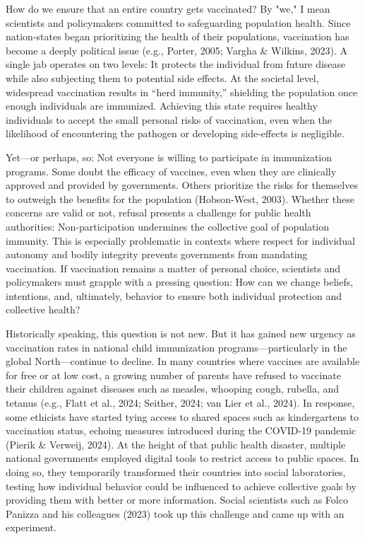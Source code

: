 \documentclass[authordate, empirical]{jote-new-article}
\begin{document}
	How do we ensure that an entire country gets vaccinated? By "we," I mean scientists and policymakers committed to safeguarding population health. Since nation-states began prioritizing the health of their populations, vaccination has become a deeply political issue (e.g., Porter, 2005; Vargha \& Wilkins, 2023). A single jab operates on two levels: It protects the individual from future disease while also subjecting them to potential side effects. At the societal level, widespread vaccination results in “herd immunity,” shielding the population once enough individuals are immunized. Achieving this state requires healthy individuals to accept the small personal risks of vaccination, even when the likelihood of encountering the pathogen or developing side-effects is negligible.







	Yet—or perhaps, so: Not everyone is willing to participate in immunization programs. Some doubt the efficacy of vaccines, even when they are clinically approved and provided by governments. Others prioritize the risks for themselves to outweigh the benefits for the population (Hobson-West, 2003). Whether these concerns are valid or not, refusal presents a challenge for public health authorities: Non-participation undermines the collective goal of population immunity. This is especially problematic in contexts where respect for individual autonomy and bodily integrity prevents governments from mandating vaccination. If vaccination remains a matter of personal choice, scientists and policymakers must grapple with a pressing question: How can we change beliefs, intentions, and, ultimately, behavior to ensure both individual protection and collective health?







	Historically speaking, this question is not new. But it has gained new urgency as vaccination rates in national child immunization programs—particularly in the global North—continue to decline. In many countries where vaccines are available for free or at low cost, a growing number of parents have refused to vaccinate their children against diseases such as measles, whooping cough, rubella, and tetanus (e.g., Flatt et al., 2024; Seither, 2024; van Lier et al., 2024). In response, some ethicists have started tying access to shared spaces such as kindergartens to vaccination status, echoing measures introduced during the COVID-19 pandemic (Pierik \& Verweij, 2024). At the height of that public health disaster, multiple national governments employed digital tools to restrict access to public spaces. In doing so, they temporarily transformed their countries into social laboratories, testing how individual behavior could be influenced to achieve collective goals by providing them with better or more information. Social scientists such as Folco Panizza and his colleagues (2023) took up this challenge and came up with an experiment.
\end{document}
